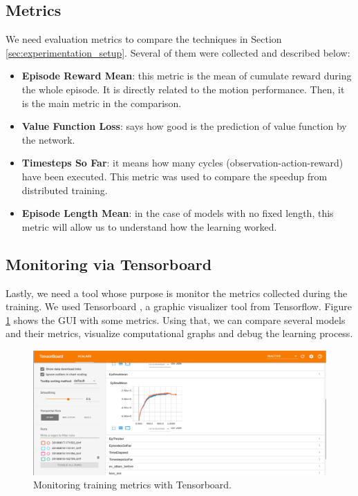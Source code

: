 \subsection{Metrics}

We need evaluation metrics to compare the techniques in Section \ref{sec:experimentation_setup}. Several of them were collected and described below:

\begin{itemize}
	\item \textbf{Episode Reward Mean}: this metric is the mean of cumulate reward during the whole episode. It is directly related to the motion performance. Then, it is the main metric in the comparison.
	\item \textbf{Value Function Loss}: says how good is the prediction of value function by the network.
	\item \textbf{Timesteps So Far}: it means how many cycles (observation-action-reward) have been executed. This metric was used to compare the speedup from distributed training.
	\item \textbf{Episode Length Mean}: in the case of models with no fixed length, this metric will allow us to understand how the learning worked.
\end{itemize} 

\subsection{Monitoring via Tensorboard}
Lastly, we need a tool whose purpose is monitor the metrics collected during the training. We used Tensorboard \cite{tensorboard}, a graphic visualizer tool from Tensorflow. Figure \ref{fig:tensorboard} shows the GUI with some metrics. Using that, we can compare several models and their metrics, visualize computational graphs and debug the learning process.

\begin{figure}[!htbp]
	\centering
	\includegraphics[width=1.0\textwidth]{Cap5/tensorboard.eps}
	\caption{ Monitoring training metrics with Tensorboard.
	}
	\label{fig:tensorboard}
\end{figure}